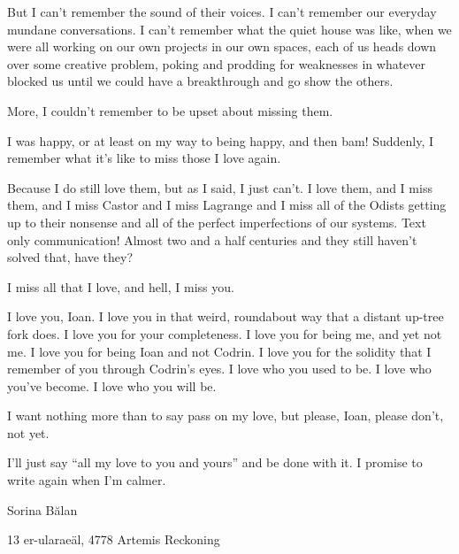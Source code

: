 But I can't remember the sound of their voices. I can't remember our everyday mundane conversations. I can't remember what the quiet house was like, when we were all working on our own projects in our own spaces, each of us heads down over some creative problem, poking and prodding for weaknesses in whatever blocked us until we could have a breakthrough and go show the others.

More, I couldn't remember to be upset about missing them.

I was happy, or at least on my way to being happy, and then bam! Suddenly, I remember what it's like to miss those I love again.

Because I do still love them, but as I said, I just can't. I love them, and I miss them, and I miss Castor and I miss Lagrange and I miss all of the Odists getting up to their nonsense and all of the perfect imperfections of our systems. Text only communication! Almost two and a half centuries and they still haven't solved that, have they?

I miss all that I love, and hell, I miss you.

I love you, Ioan. I love you in that weird, roundabout way that a distant up-tree fork does. I love you for your completeness. I love you for being me, and yet not me. I love you for being Ioan and not Codrin. I love you for the solidity that I remember of you through Codrin's eyes. I love who you used to be. I love who you've become. I love who you will be.

I want nothing more than to say pass on my love, but please, Ioan, please don't, not yet.

I'll just say ``all my love to you and yours'' and be done with it. I promise to write again when I'm calmer.

Sorina Bălan

13 er-ularaeäl, 4778 Artemis Reckoning
